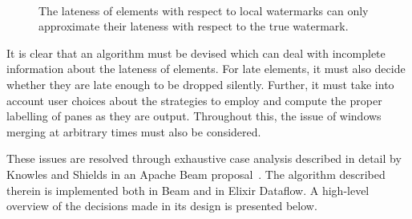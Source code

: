 \begin{figure}[t]
	\\
	\caption{The lateness of elements with respect to local watermarks can only approximate their lateness with respect to the true watermark.}
	\label{fig:impl:lateness-knowability}
\end{figure}

It is clear that an algorithm must be devised which can deal with incomplete information about the lateness of elements.
For late elements, it must also decide whether they are late enough to be dropped silently.
Further, it must take into account user choices about the strategies to employ and compute the proper labelling of panes as they are output.
Throughout this, the issue of windows merging at arbitrary times must also be considered.

These issues are resolved through exhaustive case analysis described in detail by Knowles and Shields in an Apache Beam proposal~\cite{BEAM-doc-lateness}.
The algorithm described therein is implemented both in Beam and in Elixir Dataflow.
A high-level overview of the decisions made in its design is presented below.

